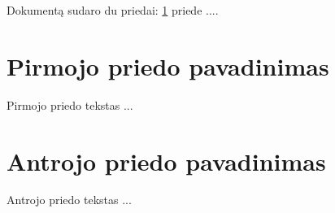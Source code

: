 \documentclass[a4paper,12pt,fleqn]{article}
\begin{document}







\newpage
{}







\newpage
\begin{appendices}
  Dokumentą sudaro du priedai: \ref{app:a} priede  ....
  \newpage
  \section{Pirmojo priedo pavadinimas}
  \label{app:a}
  Pirmojo priedo tekstas ...

  \newpage
  \section{Antrojo priedo pavadinimas}
  Antrojo priedo tekstas ...

\end{appendices}
\end{document}
